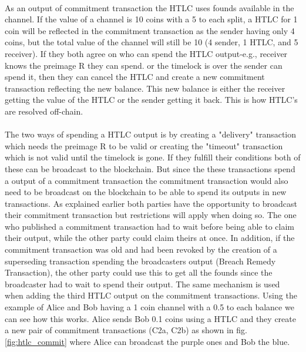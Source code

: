 \paragraph{}
As an output of commitment transaction the HTLC uses founds available in the channel. If the value of a channel is 10 coins with a 5 to each split, a HTLC for 1 coin will be reflected in the commitment transaction as the sender having only 4 coins, but the total value of the channel will still be 10 (4 sender, 1 HTLC, and 5 receiver). If they both agree on who can spend the HTLC output-e.g., receiver knows the preimage R they can spend. or the timelock is over the sender can spend it, then they can cancel the HTLC and create a new commitment transaction reflecting the new balance. This new balance is either the receiver getting the value of the HTLC or the sender getting it back. This is how HTLC's are resolved off-chain.

\paragraph{}
The two ways of spending a HTLC output is by creating a "delivery" transaction which needs the preimage R to be valid or creating the "timeout" transaction which is not valid until the timelock is gone. If they fulfill their conditions both of these can be broadcast to the blockchain. But since the these transactions spend a output of a commitment transaction the commitment transaction would also need to be broadcast on the blockchain to be able to spend its outputs in new transactions. As explained earlier both parties have the opportunity to broadcast their commitment transaction but restrictions will apply when doing so. The one who published a commitment transaction had to wait before being able to claim their output, while the other party could claim theirs at once. In addition, if the commitment transaction was old and had been revoked by the creation of a superseding transaction spending the
broadcasters output (Breach Remedy Transaction), the other party could use this to get all the founds since the broadcaster had to wait to spend their output.
The same mechanism is used when adding the third HTLC output on the commitment transactions. Using the example of Alice and Bob having a 1 coin channel with a 0.5 to each balance we can see how this works. Alice sends Bob 0.1 coins using a HTLC and they create a new pair of commitment transactions (C2a, C2b) as shown in fig.\ref{fig:htlc_commit} where Alice can broadcast the purple ones and Bob the blue.


